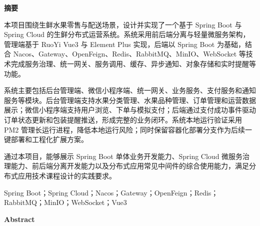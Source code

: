 
\clearpage
\thispagestyle{abstractcn}

\vspace*{1.15cm}

\begin{center}
  {\heiti\bfseries{} 摘\quad 要\par}
\end{center}

\vspace{0.25cm}

{\songti{}\setlength{\parindent}{2em}\linespread{1.65}\selectfont
本项目围绕生鲜水果零售与配送场景，设计并实现了一个基于 Spring Boot 与 Spring Cloud 的生鲜分布式运营系统。系统采用前后端分离与轻量微服务架构，管理端基于 RuoYi Vue3 与 Element Plus 实现，后端以 Spring Boot 为基础，结合 Nacos、Gateway、OpenFeign、Redis、RabbitMQ、MinIO、WebSocket 等技术完成服务治理、统一网关、服务调用、缓存、异步通知、对象存储和实时提醒等功能。

系统主要包括后台管理端、微信小程序端、统一网关、业务服务、支付服务和通知服务等模块。后台管理端支持水果分类管理、水果品种管理、订单管理和运营数据展示；微信小程序端支持用户浏览、下单与模拟支付；后端通过支付成功事件驱动订单状态更新和包装提醒推送，形成完整的业务闭环。系统本地运行验证采用 PM2 管理长运行进程，降低本地运行风险；同时保留容器化部署分支作为后续一键部署和工程化扩展方案。

通过本项目，能够展示 Spring Boot 单体业务开发能力、Spring Cloud 微服务治理能力、前后端分离开发能力以及分布式应用常见中间件的综合使用能力，满足分布式应用技术课程设计的实践要求。

\vspace{0.65cm}
Spring Boot；Spring Cloud；Nacos；Gateway；OpenFeign；Redis；RabbitMQ；MinIO；WebSocket；Vue3
\par}

\clearpage
\thispagestyle{abstracten}

\vspace*{0.9cm}

\begin{center}
  {\rmfamily\bfseries{} Abstract\par}
\end{center}

\vspace{0.15cm}

